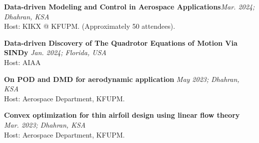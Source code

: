 \textbf{Data-driven Modeling and Control in Aerospace Applications}\hfill {\textit{Mar. 2024; Dhahran, KSA}}\\
Host: KIKX @ KFUPM. (Approximately 50 attendees).
\vspace{0.1cm}

\textbf{Data-driven Discovery of The Quadrotor Equations of Motion Via SINDy} \hfill {\textit{Jan. 2024; Florida, USA}}\\
Host: AIAA
\vspace{0.1cm}

\textbf{On POD and DMD for aerodynamic application} \hfill {\textit{May 2023; Dhahran, KSA}}\\
Host: Aerospace Department, KFUPM.
\vspace{0.1cm}

\textbf{Convex optimization for thin airfoil design using linear flow theory} \hfill {\textit{Mar. 2023; Dhahran, KSA}}\\
Host: Aerospace Department, KFUPM.